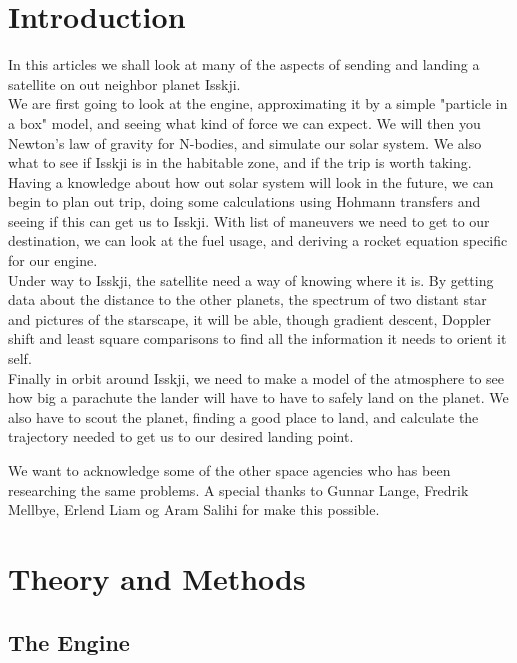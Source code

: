 \documentclass[a4paper, 10pt]{article}
\begin{document}
\tableofcontents

\section{Introduction}

In this articles we shall look at many of the aspects of sending and landing a satellite on out neighbor planet Isskji. \\

We are first going to look at the engine, approximating it by a simple "particle in a box" model, and seeing what kind of force we can expect. We will then you Newton's law of gravity for N-bodies, and simulate our solar system. We also what to see if Isskji is in the habitable zone, and if the trip is worth taking. Having a knowledge about how out solar system will look in the future, we can begin to plan out trip, doing some calculations using Hohmann transfers and seeing if this can get us to Isskji. With list of maneuvers we need to get to our destination, we can look at the fuel usage, and deriving a rocket equation specific for our engine. \\

Under way to Isskji, the satellite need a way of knowing where it is. By getting data about the distance to the other planets, the spectrum of two distant star and pictures of the starscape, it will be able, though gradient descent, Doppler shift and least square comparisons to find all the information it needs to orient it self.\\

Finally in orbit around Isskji, we need to make a model of the atmosphere to see how big a parachute the lander will have to have to safely land on the planet. We also have to scout the planet, finding a good place to land, and calculate the trajectory needed to get us to our desired landing point.

We want to acknowledge some of the other space agencies who has been researching the same problems. A special thanks to Gunnar Lange, Fredrik Mellbye, Erlend Liam og Aram Salihi for make this possible.

\section{Theory and Methods}

\subsection{The Engine}
\end{document}
